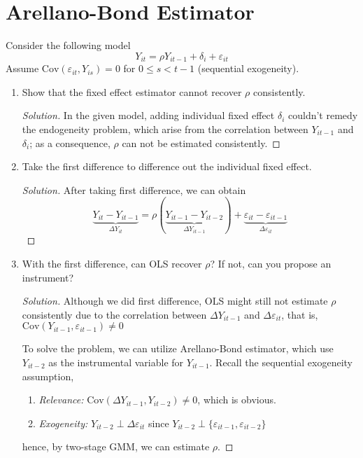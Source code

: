 \documentclass[11pt]{article}
\newenvironment{solution}{%
  \renewcommand\qedsymbol{$\blacksquare$}%
  \begin{mdframed}[backgroundcolor=gray!15]%
  \begin{proof}[Solution]}%
  {\end{proof}%
  \end{mdframed}}%
\newcommand{\cov}{\text{Cov}}
\begin{document}
        
\section{Arellano-Bond Estimator}

    Consider the following model
    \[ 
        Y_{it} = \rho Y_{it-1} + \delta_i + \varepsilon_{it} 
    \]
    Assume \( \text{Cov}(\varepsilon_{it}, Y_{is}) = 0 \) for \( 0 \leq s < t-1 \) (sequential exogeneity).

    \begin{enumerate}

        \item Show that the fixed effect estimator cannot recover \( \rho \) consistently.
        
            \begin{solution}
                In the given model, adding individual fixed effect $\delta_i$ couldn't remedy the endogeneity problem, which arise from the correlation between $Y_{it-1}$ and $\delta_i$; as a consequence, $\rho$ can not be estimated consistently.
            \end{solution}
            
        
        \item Take the first difference to difference out the individual fixed effect.
        
            \begin{solution}
                After taking first difference, we can obtain
                \[
                    \underbrace{Y_{it} - Y_{it-1}}_{\Delta Y_{it}} = \rho(\underbrace{Y_{it-1} - Y_{it-2}}_{\Delta Y_{it-1}}) + \underbrace{\varepsilon_{it} - \varepsilon_{it-1}}_{\Delta \varepsilon_{it}}
                \]
            \end{solution}
        
        \item With the first difference, can OLS recover \( \rho \)? If not, can you propose an instrument?
            
            \begin{solution}
                Although we did first difference, OLS might still not estimate $\rho$ consistently due to the correlation between $\Delta Y_{it-1}$ and $\Delta \varepsilon_{it}$, that is, $\cov(Y_{it-1}, \varepsilon_{it-1}) \neq 0$

                To solve the problem, we can utilize Arellano-Bond estimator, which use $Y_{it-2}$ as the instrumental variable for $Y_{it-1}$. Recall the sequential exogeneity assumption, 
                \begin{enumerate}
                    \item {\it Relevance:} $\cov(\Delta Y_{it-1}, Y_{it-2}) \neq 0$, which is obvious.
                    \item {\it Exogeneity:} $Y_{it-2} \perp \Delta\varepsilon_{it}$ since $Y_{it-2} \perp \{\varepsilon_{it-1},\varepsilon_{it-2}\}$
                \end{enumerate}
                hence, by two-stage GMM, we can estimate $\rho$.
            \end{solution}


\end{enumerate}
\end{document}
